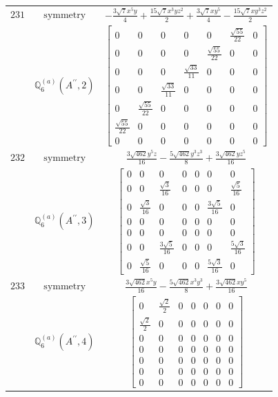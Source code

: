 \documentclass[fleqn,8pt,landscape]{jsarticle}
\begin{document}
\begin{longtable}{ccc}
$ 231 $ & $ \text{symmetry} $ & $ - \frac{3 \sqrt{7} x^{5} y}{4} + \frac{15 \sqrt{7} x^{3} y z^{2}}{2} + \frac{3 \sqrt{7} x y^{5}}{4} - \frac{15 \sqrt{7} x y^{3} z^{2}}{2} $ \\
$  $ & $ \mathbb{Q}_{6}^{(a)}(A^{\prime\prime},2) $ & $ \begin{bmatrix} 0 & 0 & 0 & 0 & 0 & \frac{\sqrt{55}}{22} & 0 \\ 0 & 0 & 0 & 0 & \frac{\sqrt{55}}{22} & 0 & 0 \\ 0 & 0 & 0 & \frac{\sqrt{33}}{11} & 0 & 0 & 0 \\ 0 & 0 & \frac{\sqrt{33}}{11} & 0 & 0 & 0 & 0 \\ 0 & \frac{\sqrt{55}}{22} & 0 & 0 & 0 & 0 & 0 \\ \frac{\sqrt{55}}{22} & 0 & 0 & 0 & 0 & 0 & 0 \\ 0 & 0 & 0 & 0 & 0 & 0 & 0 \end{bmatrix} $ \\ \hline
$ 232 $ & $ \text{symmetry} $ & $ \frac{3 \sqrt{462} y^{5} z}{16} - \frac{5 \sqrt{462} y^{3} z^{3}}{8} + \frac{3 \sqrt{462} y z^{5}}{16} $ \\
$  $ & $ \mathbb{Q}_{6}^{(a)}(A^{\prime\prime},3) $ & $ \begin{bmatrix} 0 & 0 & 0 & 0 & 0 & 0 & 0 \\ 0 & 0 & \frac{\sqrt{3}}{16} & 0 & 0 & 0 & \frac{\sqrt{5}}{16} \\ 0 & \frac{\sqrt{3}}{16} & 0 & 0 & 0 & \frac{3 \sqrt{5}}{16} & 0 \\ 0 & 0 & 0 & 0 & 0 & 0 & 0 \\ 0 & 0 & 0 & 0 & 0 & 0 & 0 \\ 0 & 0 & \frac{3 \sqrt{5}}{16} & 0 & 0 & 0 & \frac{5 \sqrt{3}}{16} \\ 0 & \frac{\sqrt{5}}{16} & 0 & 0 & 0 & \frac{5 \sqrt{3}}{16} & 0 \end{bmatrix} $ \\ \hline
$ 233 $ & $ \text{symmetry} $ & $ \frac{3 \sqrt{462} x^{5} y}{16} - \frac{5 \sqrt{462} x^{3} y^{3}}{8} + \frac{3 \sqrt{462} x y^{5}}{16} $ \\
$  $ & $ \mathbb{Q}_{6}^{(a)}(A^{\prime\prime},4) $ & $ \begin{bmatrix} 0 & \frac{\sqrt{2}}{2} & 0 & 0 & 0 & 0 & 0 \\ \frac{\sqrt{2}}{2} & 0 & 0 & 0 & 0 & 0 & 0 \\ 0 & 0 & 0 & 0 & 0 & 0 & 0 \\ 0 & 0 & 0 & 0 & 0 & 0 & 0 \\ 0 & 0 & 0 & 0 & 0 & 0 & 0 \\ 0 & 0 & 0 & 0 & 0 & 0 & 0 \\ 0 & 0 & 0 & 0 & 0 & 0 & 0 \end{bmatrix} $ \\ \hline

\end{longtable}
\end{document}
